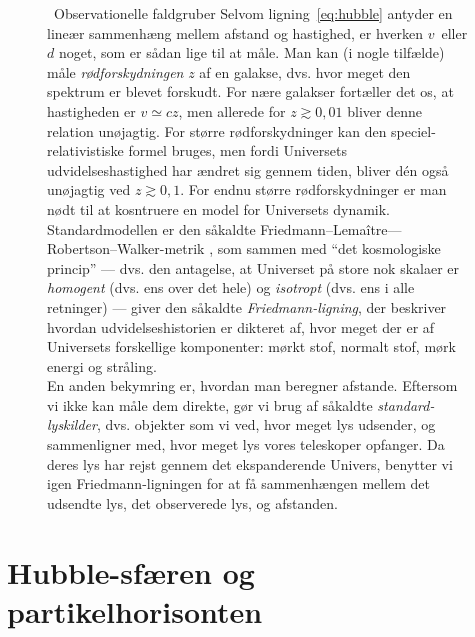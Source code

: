 \documentclass[useAMS,danish]{aa}
\def\vrec{\mbox{$v$}}
\begin{document}
\begin{figure}[!t]
\begin{bclogo}[
    couleur=gray!20,
    epBord=1,
    arrondi=0.1,
    logo=\bcinfo,
    marge=8,
    ombre=false, %
    couleurBord=gray!60,
    barre=line]
    { \ \textsf{Observationelle faldgruber}}
    \small{\textsf{
        Selvom ligning~\ref{eq:hubble} antyder en lineær sammenhæng mellem afstand og hastighed, er hverken \vrec\ eller $d$ noget, som er sådan lige til at måle.
        Man kan (i nogle tilfælde) måle \emph{rødforskydningen} $z$ af en galakse, dvs. hvor meget den spektrum er blevet forskudt.
        For nære galakser fortæller det os, at hastigheden er $\vrec\simeq cz$, men allerede for $z\gtrsim0,\!01$ bliver denne relation unøjagtig.
        For større rødforskydninger kan den speciel-relativistiske formel bruges, men fordi Universets udvidelseshastighed har ændret sig gennem tiden, bliver dén også unøjagtig ved $z\gtrsim0,\!1$.
        For endnu større rødforskydninger er man nødt til at kosntruere en model for Universets dynamik.
        Standardmodellen er den såkaldte Friedmann--Lemaître---Robertson--Walker-metrik \citep{Friedmann1922,Lemaitre1927,Robertson1935,Robertson1936a,Robertson1936b,Walker1937}, som sammen med ``det kosmologiske princip'' --- dvs. den antagelse, at Universet på store nok skalaer er \emph{homogent} (dvs. ens over det hele) og \emph{isotropt} (dvs. ens i alle retninger) --- giver den såkaldte \emph{Friedmann-ligning}, der beskriver hvordan udvidelseshistorien er dikteret af, hvor meget der er af Universets forskellige komponenter: mørkt stof, normalt stof, mørk energi og stråling.\vspace{1mm}\\
        En anden bekymring er, hvordan man beregner afstande.
        Eftersom vi ikke kan måle dem direkte, gør vi brug af såkaldte \emph{standard-lyskilder}, dvs. objekter som vi ved, hvor meget lys udsender, og sammenligner med, hvor meget lys vores teleskoper opfanger.
        Da deres lys har rejst gennem det ekspanderende Univers, benytter vi igen Friedmann-ligningen for at få sammenhængen mellem det udsendte lys, det observerede lys, og afstanden.
    }}
\label{info:obs-faldgrube}
\end{bclogo}
     \endminipage
\end{figure}

\section{Hubble-sfæren og partikelhorisonten}
\label{sec:dH-dP}
\end{document}
